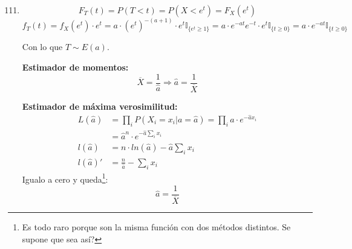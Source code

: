 \begin{enumerate}
	\setcounter{enumi}{110}
	\item
		$$F_T(t) = P(T<t) = P(X < e^t) = F_X(e^t)$$
		$$f_T(t) = f_X(e^t) \cdot e^t
			= a\cdot (e^t)^{-(a+1)}\cdot e^t \mathbb{I}_{\{e^t \geq 1\}}
			= a\cdot e^{-at} e^{-t} \cdot e^t \mathbb{I}_{\{t \geq 0\}}
			= a\cdot e^{-at} \mathbb{I}_{\{t \geq 0\}}$$
			
		Con lo que $T\sim E(a)$.
		
		\textbf{Estimador de momentos:}
		$$\overline{X} = \frac{1}{\hat a} \Rightarrow \hat a = \frac{1}{\overline X}$$
		
		\textbf{Estimador de máxima verosimilitud:}
		\begin{align*}
			L(\hat a)	& = \prod_i P(X_i = x_i | a = \hat a) = \prod_i \hat a\cdot e^{-\hat a x_i}		\\
						& = \hat a^n \cdot e^{-\hat a \sum_i x_i}										\\
			l(\hat a)	& = n\cdot ln(\hat a) - \hat a \sum_i x_i										\\
			l(\hat a)'	& = \frac{n}{\hat a} - \sum_i x_i
		\end{align*}
		Igualo a cero y queda\footnote{Es todo raro porque son la misma función con dos métodos distintos. Se supone que sea así?}:
		$$\hat a = \frac{1}{\overline X}$$
\end{enumerate}
